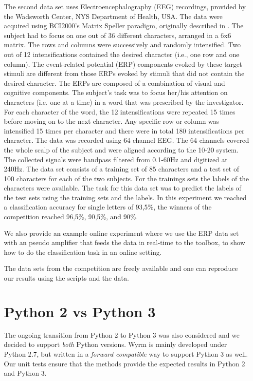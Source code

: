 \documentclass[letterpaper,compsoc,twoside]{IEEEtran}
\begin{document}
The second data set uses Electroencephalography (EEG) recordings, provided by
the Wadsworth Center, NYS Department of Health, USA. The data were acquired
using BCI2000’s Matrix Speller paradigm, originally described in \cite{Donchin}. The
subject had to focus on one out of 36 different characters, arranged in a 6x6
matrix. The rows and columns were successively and randomly intensified. Two out
of 12 intensifications contained the desired character (i.e., one row and one
column). The event-related potential (ERP) components evoked by these target
stimuli are different from those ERPs evoked by stimuli that did not contain the
desired character. The ERPs are composed of a combination of visual and
cognitive components. The subject’s task was to focus her/his attention on
characters (i.e. one at a time) in a word that was prescribed by the
investigator. For each character of the word, the 12 intensifications were
repeated 15 times before moving on to the next character. Any specific row or
column was intensified 15 times per character and there were in total 180
intensifications per character. The data was recorded using 64 channel EEG. The
64 channels covered the whole scalp of the subject and were aligned according to
the 10-20 system. The collected signals were bandpass filtered from 0.1-60Hz and
digitized at 240Hz. The data set consists of a training set of 85 characters and
a test set of 100 characters for each of the two subjects. For the trainings
sets the labels of the characters were available. The task for this data set was
to predict the labels of the test sets using the training sets and the labels.
In this experiment we reached a classification accuracy for single letters of
93,5\%, the winners of the competition reached 96,5\%, 90,5\%, and 90\%.

We also provide an example online experiment where we use the ERP data set with
an pseudo amplifier that feeds the data in real-time to the toolbox, to show how
to do the classification task in an online setting.

The data sets from the competition are freely available and one can reproduce
our results using the scripts and the data.

\section{Python 2 vs Python 3\label{python-2-vs-python-3}}


The ongoing transition from Python 2 to Python 3 was also considered and we
decided to support \emph{both} Python versions. Wyrm is mainly developed under Python
2.7, but written in a \emph{forward compatible} way to support Python 3 as well. Our
unit tests ensure that the methods provide the expected results in Python 2 and
Python 3.
\end{document}
